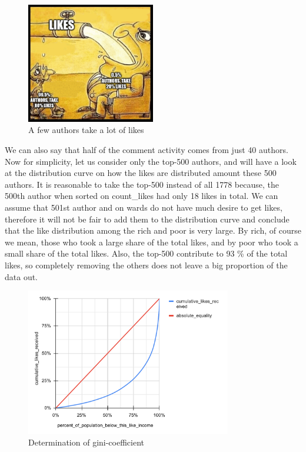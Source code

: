 \documentclass[
	11pt
] {article}
\begin{document}
	\begin{figure}[H]
		\centering
		\includegraphics[width=0.5\textwidth]{fig-small-author-take-almost-all-likes}
		\caption{A few authors take a lot of likes}
		\label{fig-small-author-take-almost-all-likes}
	\end{figure}

	We can also say that half of the comment activity comes from just 40 authors. Now for simplicity, let us consider only the top-500 authors, and will have a look at the distribution curve on how the likes are distributed amount these 500 authors. It is reasonable to take the top-500 instead of all \num{1778} because, the 500th author when sorted on count\_likes had only 18 likes in total. We can assume that 501st author and on wards do not have much desire to get likes, therefore it will not be fair to add them to the distribution curve and conclude that the like distribution among the rich and poor is very large. By rich, of course we mean, those who took a large share of the total likes, and by poor who took a small share of the total likes. Also, the top-500 contribute to \num{93} \% of the total likes, so completely removing the others does not leave a big proportion of the data out.

	\begin{figure}[H]
		\centering
		\includegraphics[width=0.8\textwidth]{fig-gini-calculation}
		\caption{Determination of gini-coefficient \cite{wikipedia-gini}}
		\label{fig-gini-calculation}
	\end{figure}
\end{document}
